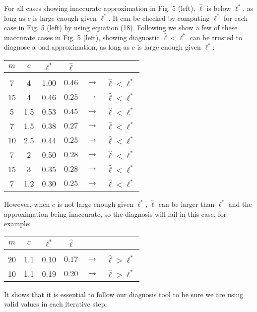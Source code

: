 \documentclass[11pt]{report}
\begin{document}
For all cases showing inaccurate approximation in Fig. 5 (left), $\hat{\ell}$ is below $\ell^*$, as long as $c$ is large enough given $\ell^*$. It can be checked by computing $\ell^*$ for each case in Fig. 5 (left) by using equation (18). Following we show a few of these inaccurate cases in Fig. 5 (left), showing diagnostic $\hat{\ell} < \ell^*$ can be trusted to diagnose a bad approximation, as long as $c$ is large enough given $\ell^*$:

\begin{table}[h]
\centering
\begin{tabular}{ c c c c c c }
$m$ & $c$ & $\ell^*$ & $\hat{\ell}$ & \\ 
\hline \\[-4mm]
7  & 4   & 1.00 & $0.46$ & $\to$ & $\hat{\ell} < \ell^*$ \\
15 & 4   & 0.46 & $0.25$ & $\to$ & $\hat{\ell} < \ell^*$ \\
5  & 1.5 & 0.53 & $0.45$ & $\to$ & $\hat{\ell} < \ell^*$ \\
7  & 1.5 & 0.38 & $0.27$ & $\to$ & $\hat{\ell} < \ell^*$ \\
10 & 2.5 & 0.44 & $0.25$ & $\to$ & $\hat{\ell} < \ell^*$ \\
7  & 2   & 0.50 & $0.28$ & $\to$ & $\hat{\ell} < \ell^*$ \\
15 & 3   & 0.35 & $0.28$ & $\to$ & $\hat{\ell} < \ell^*$ \\
7  & 1.2 & 0.30 & $0.25$ & $\to$ & $\hat{\ell} < \ell^*$ \\
\end{tabular}
\end{table}

However, when $c$ is not large enough given $\ell^*$, $\hat{\ell}$ can be larger than $\ell^*$ and the approximation being inaccurate, so the diagnosis will fail in this case, for example:

\begin{table}[h]
\centering
\begin{tabular}{ c c c c c c }
$m$ & $c$ & $\ell^*$ & $\hat{\ell}$ & \\ 
\hline \\[-4mm]
20 & 1.1 & 0.10 & $0.17$ & $\to$ & $\hat{\ell} > \ell^*$ \\
10 & 1.1 & 0.19 & $0.20$ & $\to$ & $\hat{\ell} > \ell^*$ \\
\end{tabular}
\end{table}

It shows that it is essential to follow our diagnosis tool to be sure we are using valid values in each iterative step.
\end{document}
